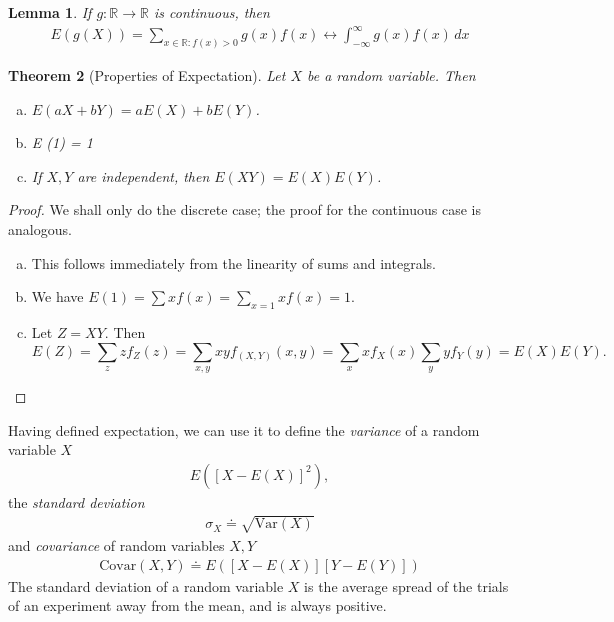 \documentclass[12pt]{article}
\newcommand{\rr}{\mathbb{R}}
\newcommand{\var}{\text{Var}}
\newcommand{\covar}{\text{Covar}}
\theoremstyle{plain}
\newtheorem{theorem}{Theorem}
\newtheorem{lemma}[theorem]{Lemma}
\theoremstyle{definition}
\theoremstyle{remark}
\numberwithin{equation}{section}  %
\begin{document}
\begin{lemma}
    If $g: \rr \to \rr$ is continuous, then
    \begin{align*}
        E(g(X)) = \sum_{x \in \rr: f(x) > 0} g(x) f(x) \longleftrightarrow
        \int_{-\infty}^{\infty} g(x) f(x) \, dx
    \end{align*}
\end{lemma}
\begin{theorem}[Properties of Expectation]
    Let $X$ be a random variable. Then
    \begin{enumerate}[(a)]
        \item $E(aX + bY) = aE(X) + bE(Y)$.
        \item E (1) = 1
        \item If $X,Y$ are independent, then $E(XY) = E(X)E(Y)$.
    \end{enumerate}
\end{theorem}
\begin{proof}
    We shall only do the discrete case; the proof for the continuous case is
    analogous.
    \begin{enumerate}[(a)]
        \item This follows immediately from the linearity of sums and integrals.
        \item
            We have $E(1) = \sum x f(x) = \sum_{x = 1} x f(x) = 1$.
        \item
            Let $Z = XY$. Then
            \[E(Z) = \sum_{z} z f_Z(z) = \sum_{x,y} xy f_{(X,Y)}(x,y) = \sum_x x f_X(x)
            \sum_y y f_Y(y) = E(X) E(Y).\]
    \end{enumerate}
\end{proof}
Having defined expectation, we can use it to define the
\emph{variance} of a random variable $X$
\begin{align*}
    E({[X - E(X)]}^2),
\end{align*}
the \emph{standard deviation}
\begin{align*}
    \sigma_X \doteq \sqrt{\var(X)}
\end{align*}
and \emph{covariance} of random variables $X, Y$
\begin{align*}
    \covar(X,Y) \doteq E([X - E(X)][Y - E(Y)])
\end{align*}
The standard deviation of a random variable $X$ is the average spread of the
trials of an experiment away from the mean, and is always positive. 
\end{document}
